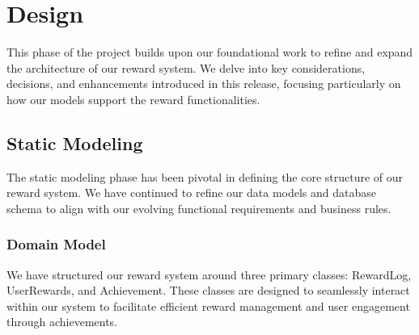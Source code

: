 \section{Design}
This phase of the project builds upon our foundational work to refine and expand the architecture of our reward system. We delve into key considerations, decisions, and enhancements introduced in this release, focusing particularly on how our models support the reward functionalities.

\subsection{Static Modeling}
The static modeling phase has been pivotal in defining the core structure of our reward system. We have continued to refine our data models and database schema to align with our evolving functional requirements and business rules.

\subsubsection{Domain Model}
We have structured our reward system around three primary classes: RewardLog, UserRewards, and Achievement. These classes are designed to seamlessly interact within our system to facilitate efficient reward management and user engagement through achievements.



